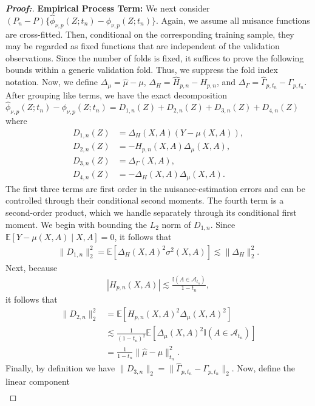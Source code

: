 \documentclass[10pt,a4paper]{amsart}
\begin{document}
\begin{proof}[\textbf{Proof:}]
\textbf{Empirical Process Term:} We next consider $(P_n-P) \{  \widehat{\phi}_{\nu, p}(Z; t_n) -\phi_{\nu, p}(Z; t_n) \}$. Again, we assume all nuisance functions are cross-fitted. Then, conditional on the corresponding training sample, they may be regarded as fixed functions that are independent of the validation observations. Since the number of folds is fixed, it suffices to prove the following bounds within a generic validation fold. Thus, we suppress the fold index notation. Now, we define $\Delta_\mu=\widehat\mu-\mu$, $\Delta_H=\widehat H_{p,n}-H_{p,n}$, and $ \Delta_\Gamma = \widehat\Gamma_{p,t_n}-\Gamma_{p,t_n}.$ After grouping like terms, we have the exact decomposition $\widehat{\phi}_{\nu, p}(Z; t_n) -\phi_{\nu, p}(Z; t_n) = D_{1,n}(Z) + D_{2,n}(Z) + D_{3,n}(Z) + D_{4,n}(Z)$ where
\begin{align*}
    D_{1, n}(Z) &= \Delta_H(X,A)(Y-\mu(X,A)), \\ 
    D_{2, n}(Z) &= - H_{p,n}(X,A)\Delta_\mu(X,A),  \\
    D_{3, n}(Z) &= \Delta_\Gamma(X,A), \\
    D_{4, n}(Z) &= - \Delta_H(X,A)\Delta_\mu(X,A).
\end{align*}
The first three terms are first order in the nuisance-estimation errors and can be controlled through their conditional second moments. The fourth term is a second-order product, which we handle separately through its conditional first moment. We begin with bounding the $L_2$ norm of $D_{1,n}$. Since $\mathbb{E}[Y-\mu(X,A)\mid X,A]=0$, it follows that
\begin{align*}
    \|D_{1,n}\|_2^2 = \mathbb{E}\!\left[ \Delta_H(X,A)^2 \sigma^2(X,A) \right] \lesssim \|\Delta_H\|_2^2.
\end{align*}
Next, because
\begin{align*}
      |H_{p,n}(X,A)| \lesssim \frac{\mathbb{I}(A\in\mathcal A_{t_n})}{1-t_n},
\end{align*}
it follows that
\begin{align*}
    \|D_{2,n}\|_2^2 &= \mathbb{E}\!\left[H_{p,n}(X,A)^2 \Delta_\mu(X,A)^2 \right] \\
    &\lesssim \frac{1}{(1-t_n)^2} \mathbb{E}\!\left[ \Delta_\mu(X,A)^2 \mathbb{I}(A\in\mathcal A_{t_n}) \right] \\
    &= \frac{1}{1-t_n} \|\widehat\mu-\mu\|_{t_n}^2.
\end{align*}
Finally, by definition we have $ \|D_{3,n}\|_2 = \|\widehat\Gamma_{p,t_n}-\Gamma_{p,t_n}\|_2.$ Now, define the linear component
\begin{align*}

\end{align*}
\end{proof}
\end{document}
